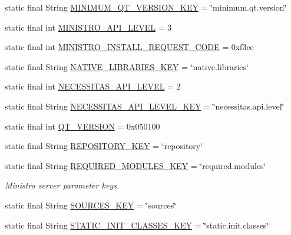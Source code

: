 \begin{DoxyCompactItemize}
\item 
static final String \hyperlink{classorg_1_1qtproject_1_1qt5_1_1android_1_1bindings_1_1_qt_activity_a79571709091b556e9e51f663fdcbe480}{M\-I\-N\-I\-M\-U\-M\-\_\-\-Q\-T\-\_\-\-V\-E\-R\-S\-I\-O\-N\-\_\-\-K\-E\-Y} = \char`\"{}minimum.\-qt.\-version\char`\"{}
\item 
static final int \hyperlink{classorg_1_1qtproject_1_1qt5_1_1android_1_1bindings_1_1_qt_activity_a1d702f784aaa9626b73aff8afa7b0715}{M\-I\-N\-I\-S\-T\-R\-O\-\_\-\-A\-P\-I\-\_\-\-L\-E\-V\-E\-L} = 3
\item 
static final int \hyperlink{classorg_1_1qtproject_1_1qt5_1_1android_1_1bindings_1_1_qt_activity_a87a83049df392efc8f93ba4ca1370082}{M\-I\-N\-I\-S\-T\-R\-O\-\_\-\-I\-N\-S\-T\-A\-L\-L\-\_\-\-R\-E\-Q\-U\-E\-S\-T\-\_\-\-C\-O\-D\-E} = 0xf3ee
\item 
static final String \hyperlink{classorg_1_1qtproject_1_1qt5_1_1android_1_1bindings_1_1_qt_activity_aee09072d2bb95f2e30d5286a2d17b7df}{N\-A\-T\-I\-V\-E\-\_\-\-L\-I\-B\-R\-A\-R\-I\-E\-S\-\_\-\-K\-E\-Y} = \char`\"{}native.\-libraries\char`\"{}
\item 
static final int \hyperlink{classorg_1_1qtproject_1_1qt5_1_1android_1_1bindings_1_1_qt_activity_ae51d7ad4cace96487bb3bd69e3eecc1b}{N\-E\-C\-E\-S\-S\-I\-T\-A\-S\-\_\-\-A\-P\-I\-\_\-\-L\-E\-V\-E\-L} = 2
\item 
static final String \hyperlink{classorg_1_1qtproject_1_1qt5_1_1android_1_1bindings_1_1_qt_activity_a7c580751c3a85da7cffdaf1988e42fba}{N\-E\-C\-E\-S\-S\-I\-T\-A\-S\-\_\-\-A\-P\-I\-\_\-\-L\-E\-V\-E\-L\-\_\-\-K\-E\-Y} = \char`\"{}necessitas.\-api.\-level\char`\"{}
\item 
static final int \hyperlink{classorg_1_1qtproject_1_1qt5_1_1android_1_1bindings_1_1_qt_activity_a8671729726d87b492286bd3c774cb223}{Q\-T\-\_\-\-V\-E\-R\-S\-I\-O\-N} = 0x050100
\item 
static final String \hyperlink{classorg_1_1qtproject_1_1qt5_1_1android_1_1bindings_1_1_qt_activity_a183751882ba4d9384a7de07f3ec432ef}{R\-E\-P\-O\-S\-I\-T\-O\-R\-Y\-\_\-\-K\-E\-Y} = \char`\"{}repository\char`\"{}
\item 
static final String \hyperlink{classorg_1_1qtproject_1_1qt5_1_1android_1_1bindings_1_1_qt_activity_a1ce85e125b559f5f3dbc6e4e74be4f16}{R\-E\-Q\-U\-I\-R\-E\-D\-\_\-\-M\-O\-D\-U\-L\-E\-S\-\_\-\-K\-E\-Y} = \char`\"{}required.\-modules\char`\"{}
\begin{DoxyCompactList}\small\item\em Ministro server parameter keys. \end{DoxyCompactList}\item 
static final String \hyperlink{classorg_1_1qtproject_1_1qt5_1_1android_1_1bindings_1_1_qt_activity_a65f1863a6452fb6963ea25ffe511e203}{S\-O\-U\-R\-C\-E\-S\-\_\-\-K\-E\-Y} = \char`\"{}sources\char`\"{}
\item 
static final String \hyperlink{classorg_1_1qtproject_1_1qt5_1_1android_1_1bindings_1_1_qt_activity_a4378655de69dad520f1a678b6e972317}{S\-T\-A\-T\-I\-C\-\_\-\-I\-N\-I\-T\-\_\-\-C\-L\-A\-S\-S\-E\-S\-\_\-\-K\-E\-Y} = \char`\"{}static.\-init.\-classes\char`\"{}
\end{DoxyCompactItemize}


